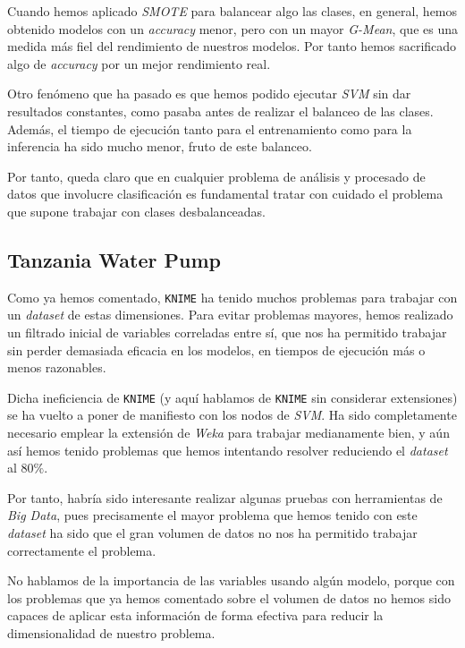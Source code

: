 \documentclass[11pt]{article}
\begin{document}
Cuando hemos aplicado \emph{SMOTE} para balancear algo las clases, en general, hemos obtenido modelos con un \emph{accuracy} menor, pero con un mayor \emph{G-Mean}, que es una medida más fiel del rendimiento de nuestros modelos. Por tanto hemos sacrificado algo de \emph{accuracy} por un mejor rendimiento real.

Otro fenómeno que ha pasado es que hemos podido ejecutar \emph{SVM} sin dar resultados constantes, como pasaba antes de realizar el balanceo de las clases. Además, el tiempo de ejecución tanto para el entrenamiento como para la inferencia ha sido mucho menor, fruto de este balanceo.

Por tanto, queda claro que en cualquier problema de análisis y procesado de datos que involucre clasificación es fundamental tratar con cuidado el problema que supone trabajar con clases desbalanceadas.

\pagebreak

\subsection{Tanzania Water Pump}

Como ya hemos comentado, \lstinline{KNIME} ha tenido muchos problemas para trabajar con un \emph{dataset} de estas dimensiones. Para evitar problemas mayores, hemos realizado un filtrado inicial de variables correladas entre sí, que nos ha permitido trabajar sin perder demasiada eficacia en los modelos, en tiempos de ejecución más o menos razonables.

Dicha ineficiencia de \lstinline{KNIME} (y aquí hablamos de \lstinline{KNIME} sin considerar extensiones) se ha vuelto a poner de manifiesto con los nodos de \emph{SVM}. Ha sido completamente necesario emplear la extensión de \emph{Weka} para trabajar medianamente bien, y aún así hemos tenido problemas que hemos intentando resolver reduciendo el \emph{dataset} al $80\%$.

Por tanto, habría sido interesante realizar algunas pruebas con herramientas de \emph{Big Data}, pues precisamente el mayor problema que hemos tenido con este \emph{dataset} ha sido que el gran volumen de datos no nos ha permitido trabajar correctamente el problema.

No hablamos de la importancia de las variables usando algún modelo, porque con los problemas que ya hemos comentado sobre el volumen de datos no hemos sido capaces de aplicar esta información de forma efectiva para reducir la dimensionalidad de nuestro problema.

\pagebreak



\end{document}
